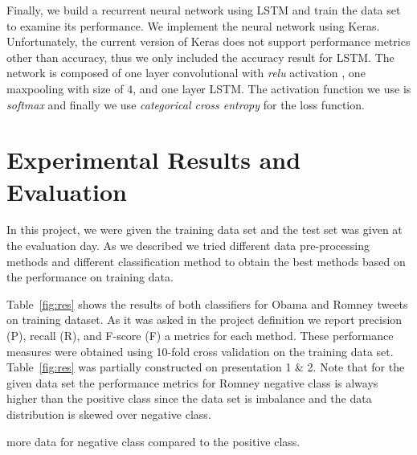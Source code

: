 \documentclass[letterpaper, 12pt]{article}
\begin{document}
Finally, we build a recurrent neural network using LSTM and train the data set to examine its 
performance. We implement the neural network using Keras. Unfortunately, the current version 
of Keras does not support performance metrics other than accuracy, thus we only included the 
accuracy result for LSTM. The network is composed of one layer convolutional with \emph{relu} activation
, one maxpooling with size of 4, and one layer LSTM. The activation function we use 
is \emph{softmax} and finally we use \emph{categorical cross entropy}
for the loss function. 


\section{Experimental Results and Evaluation}

In this project, we were given the training data set and the test set was given at the evaluation day. As we described we tried different data pre-processing methods and different classification method to obtain the best methods based on the performance on training data. 

Table~\ref{fig:res} shows the results of both 
classifiers for Obama and Romney tweets on training dataset.  As it was asked in the project definition we report precision (P), recall (R), and F-score (F) a metrics for each method.  These performance measures were obtained using 10-fold cross validation on the training data set. Table~\ref{fig:res} was partially constructed on presentation 1 \& 2.  Note that for the given data set the performance metrics for Romney negative class is always higher than the positive class since the data set is imbalance and the data distribution is skewed over negative class. 

       
more data for negative class compared to the positive class.
\end{document}
